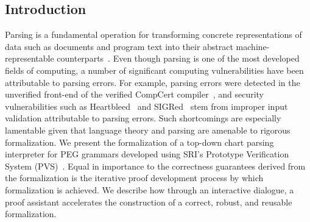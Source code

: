 \documentclass[sigplan,10pt,anonymous,review]{acmart}\settopmatter{printfolios=true,printccs=false,printacmref=false}
\begin{document}
\begin{CCSXML}


\section{Introduction}
\label{sec:intro}


Parsing is a fundamental operation for transforming concrete
representations of data such as documents and program text into their
abstract machine-representable counterparts~\cite{GruneJacobs}\@.  Even though parsing is
one of the most developed fields of computing, a number of significant
computing vulnerabilities have been attributable to parsing
errors. For example,  parsing errors were detected in the unverified
front-end of the verified CompCert
compiler~\cite{csmith}, and security vulnerabilities such as Heartbleed~\cite{carvalho2014heartbleed}  
and SIGRed~\cite{SIGRed}  stem from improper input
validation attributable to parsing errors. Such shortcomings are
especially lamentable given that language theory and parsing are
amenable to rigorous formalization.   We present the formalization of a
top-down chart parsing interpreter for PEG grammars developed using
SRI's Prototype Verification System (PVS)~\cite{Owre95:prolegomena}\@.  Equal in importance to
the correctness guarantees derived from the formalization
is the iterative proof development process by which formalization is achieved.
We  describe how through an interactive dialogue, a proof
assistant accelerates the construction of a correct, robust, and
reusable formalization.




\end{CCSXML}
\end{document}

